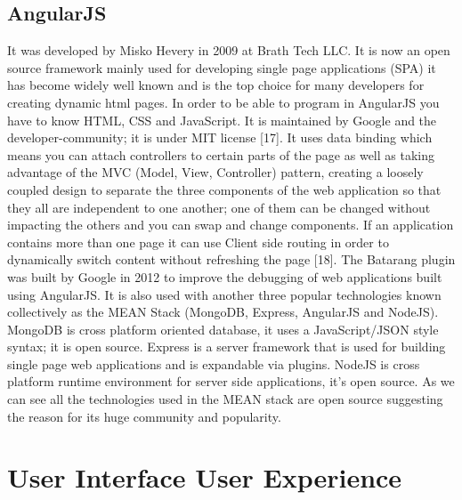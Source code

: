 \subsection{AngularJS}

It was developed by Misko Hevery in 2009 at Brath Tech LLC. It is now an
open source framework mainly used for developing single page applications
(SPA) it has become widely well known and is the top choice for many
developers for creating dynamic html pages. In order to be able to program
in AngularJS you have to know HTML, CSS and JavaScript. It is maintained by
Google and the developer-community; it is under MIT license [17]. It uses
data binding which means you can attach controllers to certain parts of the
page as well as taking advantage of the MVC (Model, View, Controller)
pattern, creating a loosely coupled design to separate the three components
of the web application so that they all are independent to one another; one of
them can be changed without impacting the others and you can swap and
change components. If an application contains more than one page it can use
Client side routing in order to dynamically switch content without refreshing
the page [18]. The Batarang plugin was built by Google in 2012 to improve
the debugging of web applications built using AngularJS. It is also used with
another three popular technologies known collectively as the MEAN Stack
(MongoDB, Express, AngularJS and NodeJS). MongoDB is cross platform
oriented database, it uses a JavaScript/JSON style syntax; it is open source.
Express is a server framework that is used for building single page web
applications and is expandable via plugins. NodeJS is cross platform runtime
environment for server side applications, it’s open source. As we can see all
the technologies used in the MEAN stack are open source suggesting the
reason for its huge community and popularity.

\section{ User Interface User Experience}


